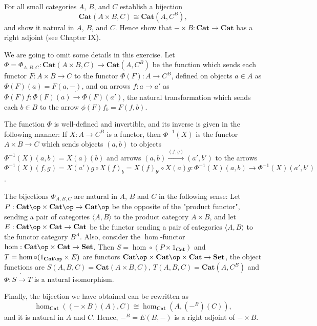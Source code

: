 \begin{exercise}
For all small categories $A$, $B$, and $C$ establish a bijection
\[\mathbf{Cat}(A\times B,C)\cong\mathbf{Cat}(A,C^B),\]
and show it natural in $A$, $B$, and $C$. Hence show that $-\times B:\mathbf{Cat}\to\mathbf{Cat}$ has a right adjoint (see Chapter IX).
\end{exercise}
\begin{solution}
We are going to omit some details in this exercise. Let $\Phi=\Phi_{A,B,C}:\mathbf{Cat}(A\times B,C)\to\mathbf{Cat}(A,C^B)$ be the function which sends each functor $F:A\times B\to C$ to the functor $\Phi(F):A\to C^B$, defined on objects $a\in A$ as $\Phi(F)(a)=F(a,-)$, and on arrows $f:a\to a'$ as $\Phi(F)f:\Phi(F)(a)\dot{\to}\Phi(F)(a')$, the natural transformation which sends each $b\in B$ to the arrow $\phi(F)f_b=F(f,b)$.

The function $\Phi$ is well-defined and invertible, and its inverse is given in the following manner: If $X:A\to C^B$ is a functor, then $\Phi^{-1}(X)$ is the functor $A\times B\to C$ which sends objects $(a,b)$ to objects $\Phi^{-1}(X)(a,b)=X(a)(b)$ and  arrows $(a,b)\overset{(f,g)}{\to}(a',b')$ to the arrows $\Phi^{-1}(X)(f,g)=X(a')g\circ X(f)_b=X(f)_{b'}\circ X(a)g:\Phi^{-1}(X)(a,b)\to\Phi^{-1}(X)(a',b')$.

The bijections $\Phi_{A,B,C}$ are natural in $A$, $B$ and $C$ in the following sense: Let $P:\mathbf{Cat}\op\times\mathbf{Cat}\op\to\mathbf{Cat}\op$ be the opposite of the "product functor", sending a pair of categories $\langle A,B\rangle$ to the product category $A\times B$, and let $E:\mathbf{Cat}\op\times\mathbf{Cat}\to\mathbf{Cat}$ be the functor sending a pair of categories $\langle A,B\rangle$ to the functor category $B^A$. Also, consider the $\hom$-functor $\hom:\mathbf{Cat}\op\times\mathbf{Cat}\to\mathbf{Set}$. Then $S=\hom\circ (P\times 1_{\mathbf{Cat}})$ and $T=\hom\circ(1_{\mathbf{Cat}\op}\times E)$ are functors $\mathbf{Cat}\op\times\mathbf{Cat}\op\times\mathbf{Cat}\to\mathbf{Set}$, the object functions are $S(A,B,C)=\mathbf{Cat}(A\times B,C)$, $T(A,B,C)=\mathbf{Cat}(A,C^B)$ and $\Phi:S\dot{\to} T$ is a natural isomorphism.

Finally, the bijection we have obtained can be rewritten as
\[\hom_{\mathbf{Cat}}((-\times B)(A),C)\cong\hom_{\mathbf{Cat}}(A,(- ^B)(C)),\]
and it is natural in $A$ and $C$. Hence, $-^B=E(B,-)$ is a right adjoint of $-\times B$.
\end{solution}

